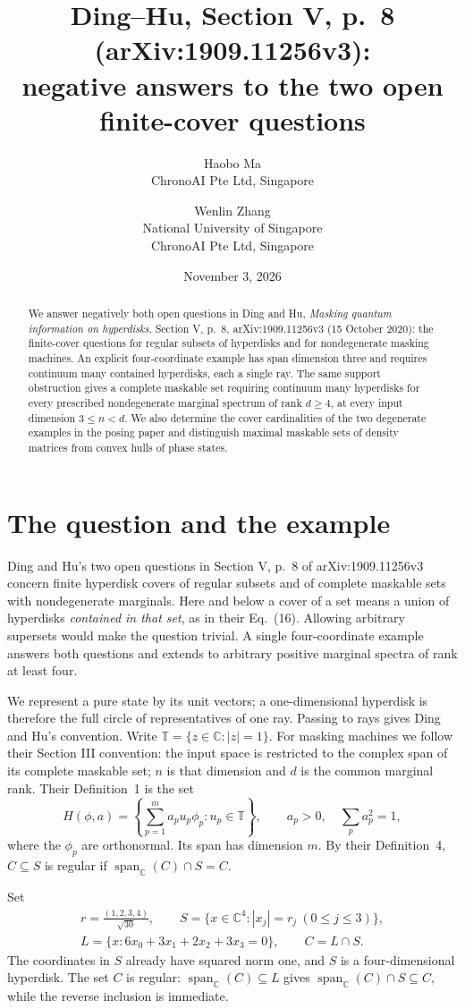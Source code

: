 \documentclass[11pt]{article}
\title{Ding--Hu, Section V, p.~8 (arXiv:1909.11256v3):\\
negative answers to the two open finite-cover questions}
\author{Haobo Ma\\\small ChronoAI Pte Ltd, Singapore
\and Wenlin Zhang\\\small National University of Singapore\\\small ChronoAI Pte Ltd, Singapore}
\date{November 3, 2026}
\newcommand{\C}{\mathbb C}
\newcommand{\T}{\mathbb T}
\newcommand{\Span}{\operatorname{span}_{\C}}
\begin{document}
\maketitle
\begin{abstract}
We answer negatively both open questions in Ding and Hu,
\emph{Masking quantum information on hyperdisks}, Section V, p.~8,
arXiv:1909.11256v3 (15 October 2020): the finite-cover questions for regular
subsets of hyperdisks and for nondegenerate masking machines.
An explicit four-coordinate example has span dimension three and requires
continuum many contained hyperdisks, each a single ray.
The same support obstruction gives a complete maskable set requiring
continuum many hyperdisks for every prescribed nondegenerate marginal
spectrum of rank $d\ge4$, at every input dimension $3\le n<d$.
We also determine the cover cardinalities of the two degenerate examples
in the posing paper and distinguish maximal maskable sets of density
matrices from convex hulls of phase states.
\end{abstract}

\section{The question and the example}
Ding and Hu's two open questions in Section V, p.~8 of
arXiv:1909.11256v3 \cite{dinghu} concern finite hyperdisk covers of regular
subsets and of complete maskable sets with nondegenerate marginals.
Here and below a
cover of a set means a union of hyperdisks \emph{contained in that set},
as in their Eq.~(16). Allowing arbitrary supersets would make the question
trivial. A single four-coordinate example answers both questions and
extends to arbitrary positive marginal spectra of rank at least four.

We represent a pure state by its unit vectors; a one-dimensional hyperdisk
is therefore the full circle of representatives of one ray. Passing to
rays gives Ding and Hu's convention. Write $\T=\{z\in\C:|z|=1\}$.
For masking machines we follow their Section III convention: the input
space is restricted to the complex span of its complete maskable set;
$n$ is that dimension and $d$ is the common marginal rank.
Their Definition~1 is the set
\[
 H(\phi,a)=\left\{\sum_{p=1}^m a_pu_p\phi_p:u_p\in\T\right\},
 \qquad a_p>0,\quad \sum_pa_p^2=1,
\]
where the $\phi_p$ are orthonormal. Its span has dimension $m$.
By their Definition~4, $C\subseteq S$ is regular if
$\Span(C)\cap S=C$.

Set
\begin{equation}\label{eq:example}
 \begin{gathered}
 r=\frac{(1,2,3,4)}{\sqrt{30}},\qquad
 S=\{x\in\C^4:|x_j|=r_j\ (0\le j\le3)\},\\
 L=\{x:6x_0+3x_1+2x_2+3x_3=0\},\qquad C=L\cap S.
 \end{gathered}
\end{equation}
The coordinates in $S$ already have squared norm one, and $S$ is a
four-dimensional hyperdisk. The set $C$ is regular: $\Span(C)\subseteq L$
gives $\Span(C)\cap S\subseteq C$, while the reverse inclusion is immediate.
\end{document}

